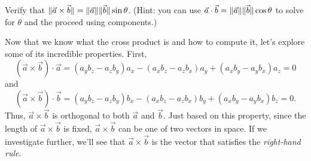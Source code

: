 \begin{exercise}
	Verify that $\lVert\vec a\times \vec b\rVert=\lVert\vec a\rVert\lVert\vec b\rVert\sin\theta$. (Hint: you
	can use $\vec a\cdot \vec b=\lVert\vec a\rVert\lVert\vec b\rVert\cos\theta$ to solve for $\theta$
	and the proceed using components.)
\end{exercise}

Now that we know what the cross product is and how to compute it, let's explore
some of its incredible properties.  First,
\[
	(\vec a\times\vec b)\cdot \vec a=(a_yb_z - a_zb_y)a_x - (a_xb_z - a_zb_x)a_y + (a_xb_y - a_yb_x)a_z=0
\]
and 
\[
	(\vec a\times\vec b)\cdot \vec b=(a_yb_z - a_zb_y)b_x - (a_xb_z - a_zb_x)b_y + (a_xb_y - a_yb_x)b_z=0.
\]
Thus, $\vec a\times\vec b$ is orthogonal to both $\vec a$ and $\vec b$.  
Just based on this property, since the length of $\vec a\times \vec b$ is fixed, $\vec a\times\vec b$
can be one of two vectors in space.
If we investigate further, we'll
see that $\vec a\times\vec b$ is the vector that satisfies the \emph{right-hand rule}.

